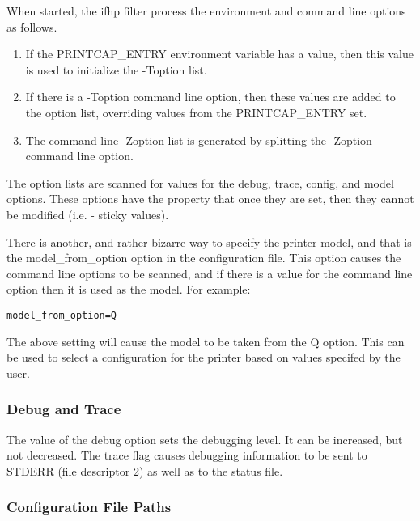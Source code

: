 \documentclass[a4paper]{article}
\begin{document}
When started,
the
{\ttfamily ifhp}
filter process the environment and command line options as follows.
\begin{enumerate}
\item If the
{\ttfamily PRINTCAP\_ENTRY}
environment variable has a value,
then this value is used to initialize the
{\ttfamily -Toption}
list.
\item If there is a
{\ttfamily -Toption}
command line option,
then these values are added to the
option list,
overriding values from the
{\ttfamily PRINTCAP\_ENTRY}
set.
\item The command line
{\ttfamily -Zoption}
list is generated by splitting the
{\ttfamily -Zoption}
command line option.
\end{enumerate}


The option lists are scanned for values for the
{\ttfamily debug},
{\ttfamily trace},
{\ttfamily config},
and
{\ttfamily model}
options.
These options
have the property that once they are set, then they cannot be modified
(i.e. - sticky values).

\label{model_from_option}
There is another,
and rather bizarre way to specify the printer model,
and that is the
{\ttfamily model\_from\_option}
option in the configuration file.
This option causes the command line options to be scanned,
and if there is a value for the command line option then it
is used as the model.
For example:
\begin{tscreen}
\begin{verbatim}
model_from_option=Q
\end{verbatim}
\end{tscreen}


The above setting will cause the model to be taken from the
{\ttfamily Q} option.
This can be used to select a configuration for the printer
based on values specifed by the user.


\subsubsection{Debug and Trace
\label{debug}
\label{trace}}

The value of the
{\ttfamily debug}
option sets the debugging level.
It can be increased, but not decreased.
The
{\ttfamily trace}
flag causes debugging information to be sent to STDERR (file descriptor 2)
as well as to the status file.


\subsubsection{Configuration File Paths
\label{configpaths}
\label{config}}
\end{document}
